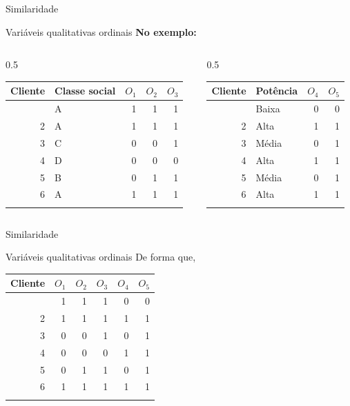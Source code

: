 \documentclass[
  ignorenonframetext,
  aspectratio=169,
]{beamer}
\begin{document}
\begin{frame}{Similaridade}
\label{similaridade-5}
\begin{block}{Variáveis qualitativas ordinais}
\label{variuxe1veis-qualitativas-ordinais-1}
\textbf{No exemplo:}

\begin{columns}[T]
\begin{column}{0.5\linewidth}
\begin{longtable}[]{@{}rlrrr@{}}
\toprule\noalign{}
Cliente & Classe social & \(O_1\) & \(O_2\) & \(O_3\) \\
\midrule\noalign{}
\endhead
1 & A & 1 & 1 & 1 \\
2 & A & 1 & 1 & 1 \\
3 & C & 0 & 0 & 1 \\
4 & D & 0 & 0 & 0 \\
5 & B & 0 & 1 & 1 \\
6 & A & 1 & 1 & 1 \\
\bottomrule\noalign{}
\end{longtable}
\end{column}

\begin{column}{0.5\linewidth}
\begin{longtable}[]{@{}rlrr@{}}
\toprule\noalign{}
Cliente & Potência & \(O_4\) & \(O_5\) \\
\midrule\noalign{}
\endhead
1 & Baixa & 0 & 0 \\
2 & Alta & 1 & 1 \\
3 & Média & 0 & 1 \\
4 & Alta & 1 & 1 \\
5 & Média & 0 & 1 \\
6 & Alta & 1 & 1 \\
\bottomrule\noalign{}
\end{longtable}
\end{column}
\end{columns}
\end{block}
\end{frame}

\begin{frame}{Similaridade}
\label{similaridade-6}
\begin{block}{Variáveis qualitativas ordinais}
\label{variuxe1veis-qualitativas-ordinais-2}
De forma que,

\begin{longtable}[]{@{}rrrrrr@{}}
\toprule\noalign{}
Cliente & \(O_1\) & \(O_2\) & \(O_3\) & \(O_4\) & \(O_5\) \\
\midrule\noalign{}
\endhead
1 & 1 & 1 & 1 & 0 & 0 \\
2 & 1 & 1 & 1 & 1 & 1 \\
3 & 0 & 0 & 1 & 0 & 1 \\
4 & 0 & 0 & 0 & 1 & 1 \\
5 & 0 & 1 & 1 & 0 & 1 \\
6 & 1 & 1 & 1 & 1 & 1 \\
\bottomrule\noalign{}
\end{longtable}
\end{block}
\end{frame}
\end{document}
